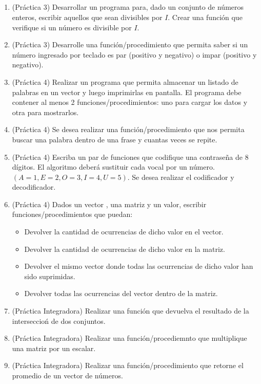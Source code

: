 \documentclass[a4paper,10pt]{article}
\begin{document}
~\\ \\ \\ \\

\begin{enumerate}

\item (Pr\'actica 3) Desarrollar un programa para, dado un conjunto de n\'umeros enteros, escribir aquellos que sean divisibles por $I$. Crear una funci\'on que verifique si un n\'umero es divisible por $I$.   
    
\item (Pr\'actica 3) Desarrolle una funci\'on/procedimiento que permita saber si un n\'umero ingresado por teclado es par (positivo y negativo) o impar (positivo y negativo).

\item (Pr\'actica 4) Realizar un programa que permita almacenar un listado de palabras en un vector y luego imprimirlas en pantalla. El programa debe contener al menos 2 funciones/procedimientos: uno para cargar los datos y otra para mostrarlos.

\item (Pr\'actica 4) Se desea realizar una funci\'on/procedimiento que nos permita buscar una palabra dentro de una frase y cuantas veces se repite.

\item (Pr\'actica 4) Escriba un par de funciones que codifique una contrase\~na de 8 d\'igitos. El algoritmo deber\'a sustituir cada vocal por un n\'umero. $(A=1, E=2, O=3, I=4, U=5)$. Se desea realizar el codificador y decodificador.


\item (Pr\'actica 4) Dados un vector , una matriz y un valor, escribir funciones/procedimientos que puedan:
    \begin{itemize}
        \item[a-] Devolver la cantidad de ocurrencias de dicho valor en el vector.
        \item[b-] Devolver la cantidad de ocurrencias de dicho valor en la matriz.
        \item[c-] Devolver el mismo vector donde todas las ocurrencias de dicho valor han sido suprimidas.
        \item[c-] Devolver todas las ocurrencias del vector dentro de la matriz.
    \end{itemize}

\item (Pr\'actica Integradora) Realizar una funci\'on que devuelva el resultado de la interseccio\'n de dos conjuntos.

\item (Pr\'actica Integradora) Realizar una funci\'on/procediemnto que multiplique una matriz por un escalar.

\item (Pr\'actica Integradora) Realizar una funci\'on/procedimiento que retorne el promedio de un vector de n\'umeros.

\end{enumerate}
\end{document}
